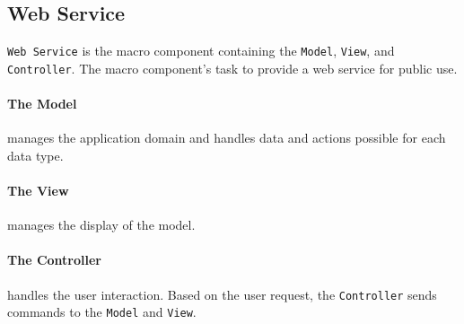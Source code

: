 \subsection*{Web Service}\texttt{Web Service} is the macro component containing the \texttt{Model}, \texttt{View}, and \texttt{Controller}.
The macro component's task to provide a web service for public use.

\paragraph{The Model} manages the application domain and handles data and actions possible for each data type.

\paragraph{The View} manages the display of the model.

\paragraph{The Controller} handles the user interaction. Based on the user request, the \texttt{Controller} sends commands to the \texttt{Model} and \texttt{View}.